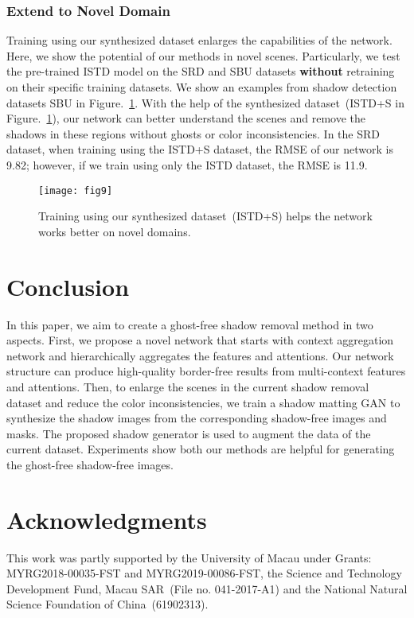 \documentclass[letterpaper]{article} \usepackage{aaai20}  \usepackage{times}  \usepackage{helvet} \usepackage{courier}  \usepackage[hyphens]{url}  \urlstyle{rm} \def\UrlFont{\rm}  \usepackage{graphicx}  \frenchspacing  \setlength{\pdfpagewidth}{8.5in}  \setlength{\pdfpageheight}{11in}  \usepackage{amssymb}
\begin{document}
\subsubsection{Extend to Novel Domain}
Training using our synthesized dataset enlarges the capabilities of the network. Here, we show the potential of our methods in novel scenes. Particularly, we test the pre-trained ISTD model on the SRD and SBU datasets \textbf{without} retraining on their specific training datasets. We show an examples from shadow detection datasets SBU in Figure.~\ref{fig:novel}. With the help of the synthesized dataset~(ISTD+S in Figure.~\ref{fig:novel}), our network can better understand the scenes and remove the shadows in these regions without ghosts or color inconsistencies. In the SRD dataset, when training using the ISTD+S dataset, the RMSE of our network is 9.82; however, if we train using only the ISTD dataset, the RMSE is 11.9. 

\begin{figure}[t]
\centering     \texttt{[image: fig9]}
\caption{Training using our synthesized dataset~(ISTD+S) helps the network works better on novel domains.}
\label{fig:novel}
\end{figure}

\section{Conclusion}
In this paper, we aim to create a ghost-free shadow removal method in two aspects. First, we propose a novel network that starts with context aggregation network and hierarchically aggregates the features and attentions. Our network structure can produce high-quality border-free results from multi-context features and attentions. Then, to enlarge the scenes in the current shadow removal dataset and reduce the color inconsistencies, we train a shadow matting GAN to synthesize the shadow images from the corresponding shadow-free images and masks. The proposed shadow generator is used to augment the data of the current dataset. Experiments show both our methods are helpful for generating the ghost-free shadow-free images. 

\section{Acknowledgments}
This work was partly supported by the University of Macau under Grants: MYRG2018-00035-FST and MYRG2019-00086-FST, the Science and Technology Development Fund, Macau SAR~(File no. 041-2017-A1) and the National Natural Science Foundation of China~(61902313).



\end{document}
